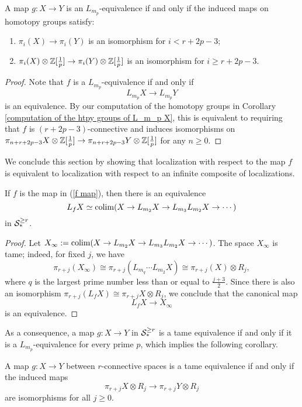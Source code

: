 \begin{corollary}
\label{Char of tame equivalence in spaces}
	A map $g:X \to Y$ is an $L_{m_p}$-equivalence if and only if the induced maps on homotopy groups satisfy:
	\begin{enumerate}
		\item  $\pi_i(X) \to \pi_i (Y)$ is an isomorphism for $i <r+2p-3$;
		\item $\pi_i(X)\otimes {\mathbb{Z}}[\frac{1}{p}] \to \pi_i(Y)\otimes {\mathbb{Z}}[\frac{1}{p}]$ is an isomorphism for $i \geq r+2p-3$.
	\end{enumerate}
\end{corollary}
\begin{proof}
Note that $f$ is a $L_{m_p}$-equivalence if and only if  
$$
L_{m_p}X \to L_{m_p}Y
$$
is an equivalence. By our computation of the homotopy groups in Corollary \ref{computation of the htpy groups of L_m_p X}, this is equivalent to requiring that $f$ is $(r+2p-3)$-connective and induces isomorphisms on 
	$
	\pi_{n+r+2p-3}X\otimes {\mathbb{Z}}[\frac{1}{p}]\to \pi_{n+r+2p-3}Y\otimes {\mathbb{Z}}[\frac{1}{p}]
	$
	for any $n\geq 0$.

\end{proof}

We conclude this section by showing that localization with respect to the map $f$ is equivalent to localization with respect to an infinite composite of localizations.
\begin{proposition}
	\label{Characterization of tame localization}
	If $f$ is the map in (\ref{f map}), then there is an equivalence
	\[
	L_f X \simeq \operatorname{colim}(X\to L_{m_2}X\to L_{m_3}L_{m_2}X\to \cdots)
	\]	
	in ${\mathcal{S}}^{\geq r}_*$. 
\end{proposition}
\begin{proof}
	Let $X_{\infty}:=\operatorname{colim}(X\to L_{m_2}X\to L_{m_3}L_{m_2}X\to \cdots)$. 
	The space $X_\infty$ is tame; indeed, for fixed $j$, we have
	\[
	\pi_{r+j}(X_{\infty})\cong \pi_{r+j}(L_{m_q}\cdots L_{m_2}X)\cong \pi_{r+j}(X) \otimes R_{j},
	\]
	where $q$ is the largest prime number less than or equal to $\frac{j+3}{2}$. 
	Since there is also an isomorphism $\pi_{r+j}(L_f X)\cong \pi_{r+j}X\otimes R_j$, we conclude that the canonical map
	$$
	L_f X \to X_{\infty}
	$$
	is an equivalence.

\end{proof}
As a consequence, a map $g: X\to Y$ in ${\mathcal{S}}^{\geq r}_{*}$ is a tame equivalence if and only if it is a $L_{m_p}$-equivalence for every prime $p$, which implies the following corollary.
\begin{corollary}
\label{char of tame equivalences for spaces}
        A map $g: X\to Y$ between $r$-connective spaces is a tame equivalence if and only if the induced maps
        $$
        \pi_{r+j}X \otimes R_{j} 
        \to
        \pi_{r+j}Y \otimes R_{j}
        $$
        are isomorphisms for all $j\geq 0$.
\end{corollary}

